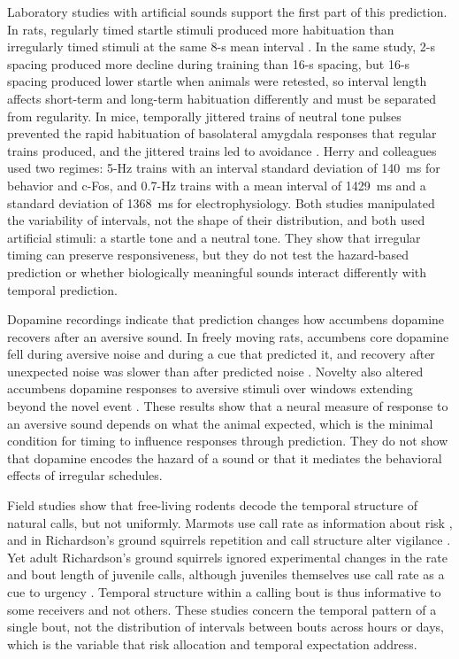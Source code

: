 Laboratory studies with artificial sounds support the first part of this prediction. In rats, regularly timed startle stimuli produced more habituation than irregularly timed stimuli at the same 8-s mean interval \citep{Davis1970}. In the same study, 2-s spacing produced more decline during training than 16-s spacing, but 16-s spacing produced lower startle when animals were retested, so interval length affects short-term and long-term habituation differently and must be separated from regularity. In mice, temporally jittered trains of neutral tone pulses prevented the rapid habituation of basolateral amygdala responses that regular trains produced, and the jittered trains led to avoidance \citep{HerryEtAl2007}. Herry and colleagues used two regimes: 5-Hz trains with an interval standard deviation of 140~ms for behavior and c-Fos, and 0.7-Hz trains with a mean interval of 1429~ms and a standard deviation of 1368~ms for electrophysiology. Both studies manipulated the variability of intervals, not the shape of their distribution, and both used artificial stimuli: a startle tone and a neutral tone. They show that irregular timing can preserve responsiveness, but they do not test the hazard-based prediction or whether biologically meaningful sounds interact differently with temporal prediction.

Dopamine recordings indicate that prediction changes how accumbens dopamine recovers after an aversive sound. In freely moving rats, accumbens core dopamine fell during aversive noise and during a cue that predicted it, and recovery after unexpected noise was slower than after predicted noise \citep{GoedhoopEtAl2022}.
Novelty also altered accumbens dopamine responses to aversive stimuli over windows extending beyond the novel event \citep{KutluEtAl2025}.
These results show that a neural measure of response to an aversive sound depends on what the animal expected, which is the minimal condition for timing to influence responses through prediction. They do not show that dopamine encodes the hazard of a sound or that it mediates the behavioral effects of irregular schedules.

Field studies show that free-living rodents decode the temporal structure of natural calls, but not uniformly.
Marmots use call rate as information about risk \citep{BlumsteinArmitage1997}, and in Richardson's ground squirrels repetition and call structure alter vigilance \citep{SloanEtAl2005,SwanHare2008}. Yet adult Richardson's ground squirrels ignored experimental changes in the rate and bout length of juvenile calls, although juveniles themselves use call rate as a cue to urgency \citep{SloanHare2006}. Temporal structure within a calling bout is thus informative to some receivers and not others. These studies concern the temporal pattern of a single bout, not the distribution of intervals between bouts across hours or days, which is the variable that risk allocation and temporal expectation address.

